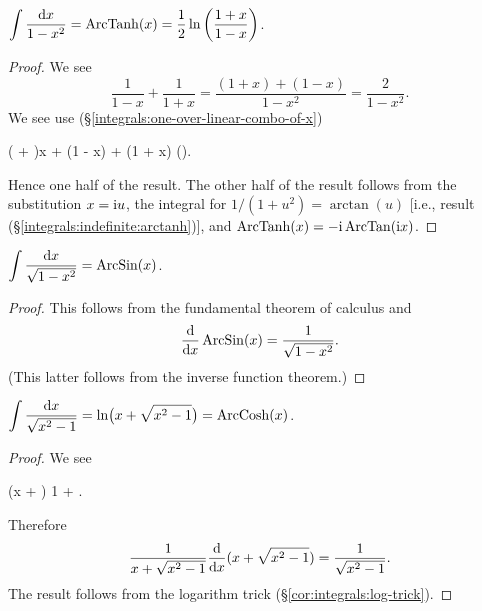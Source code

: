 \M $\displaystyle{\int\frac{\mathrm{d}x}{1 - x^{2}} = \operatorname{ArcTanh}(x) = \frac{1}{2}\ln\left(\frac{1+x}{1-x}\right)}$.

\begin{proof}
  We see
\begin{equation}\label{eq:integrals:indefinite:arctanh:intermediate-step}
\frac{1}{1 - x} + \frac{1}{1 + x}
= \frac{(1 + x) + (1 - x)}{1 - x^{2}}
= \frac{2}{1 - x^{2}}.
\end{equation}
We see use (\S\ref{integrals:one-over-linear-combo-of-x}) 
\begin{calculation}
  \int{}
  \int{}\left( + \right)\D x
  \int{} + \int{}
  \ln(1 - x) + \ln(1 + x)
  \ln\left(\right).
\end{calculation}
Hence one half of the result. The other half of the result follows from
the substitution $x=\mathrm{i} u$, the integral for $1/(1+u^{2})=\arctan(u)$
[i.e., result (\S\ref{integrals:indefinite:arctanh})],
and $\operatorname{ArcTanh}(x)=-\mathrm{i}\operatorname{ArcTan}(\mathrm{i} x)$.
\end{proof}

\M $\displaystyle{\int\frac{\mathrm{d}x}{\sqrt{1 - x^{2}}} = \operatorname{ArcSin}(x)}$.

\begin{proof}
This follows from the fundamental theorem of calculus and
\begin{equation}
\frac{\mathrm{d}}{\mathrm{d} x}\operatorname{ArcSin}(x) = \frac{1}{\sqrt{1 - x^{2}}}.
\end{equation}
(This latter follows from the inverse function theorem.)
\end{proof}

\M $\displaystyle{\int\frac{\mathrm{d}x}{\sqrt{x^{2} - 1}} = \ln\bigl(x + \sqrt{x^{2}-1}\bigr)=\operatorname{ArcCosh}(x)}$.

\begin{proof}
We see
\begin{calculation}
  (x + )
  1 + 
  .
\end{calculation}
Therefore
\begin{equation}
\frac{1}{x + \sqrt{x^{2} - 1}}\frac{\mathrm{d}}{\mathrm{d} x}(x + \sqrt{x^{2} - 1})
= \frac{1}{\sqrt{x^{2} - 1}}.
\end{equation}
The result follows from the logarithm trick (\S\ref{cor:integrals:log-trick}).
\end{proof}


